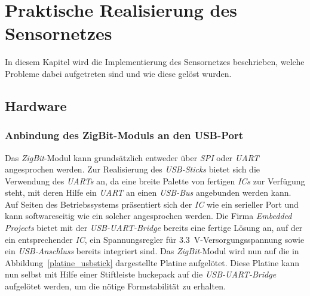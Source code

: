 
\chapter{Praktische Realisierung des Sensornetzes}\label{Implementierung}

In diesem Kapitel wird die Implementierung des Sensornetzes beschrieben, welche Probleme dabei aufgetreten
sind und wie diese gelöst wurden.

\section{Hardware}
\subsection{Anbindung des ZigBit-Moduls an den USB-Port}
Das \emph{ZigBit}-Modul kann grundsätzlich entweder über \emph{SPI} oder \emph{UART} angesprochen werden. 
Zur Realisierung des \emph{USB-Sticks} bietet sich die Verwendung des \emph{UARTs} an, da eine breite Palette 
von fertigen \emph{ICs} zur Verfügung steht, mit deren Hilfe ein \emph{UART} an einen \emph{USB-Bus} angebunden werden 
kann. Auf Seiten des Betriebssystems präsentiert sich der \emph{IC} wie ein serieller Port und kann softwareseitig
wie ein solcher angesprochen werden. Die Firma \emph{Embedded Projects} bietet mit der \emph{USB-UART-Bridge}
bereits eine fertige Lösung an, auf der ein entsprechender \emph{IC}, ein Spannungsregler für 3.3~V-Versorgungsspannung
sowie ein \emph{USB-Anschluss} bereits integriert sind. Das \emph{ZigBit}-Modul wird nun auf die in 
Abbildung~\ref{platine_usbstick} dargestellte Platine aufgelötet. Diese Platine kann nun selbst mit Hilfe einer
Stiftleiste huckepack auf die \emph{USB-UART-Bridge} aufgelötet werden, um die nötige Formstabilität zu erhalten.

